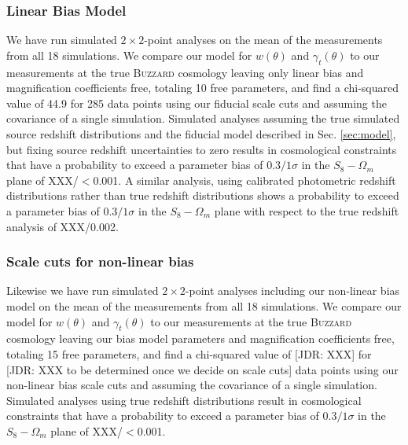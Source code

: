 \documentclass[fleqn,usenatbib]{mnras}
\newcommand{\lcdm}{$\Lambda$CDM}
\newcommand{\jdr}[1]{{\color{blue}[JDR: #1]}}
\begin{document}
\subsubsection{Linear Bias Model}
We have run simulated $2\times 2$-point analyses on the mean of the measurements from all 18 simulations. We compare our model for $w(\theta)$ and $\gamma_t(\theta)$ to our measurements at the true \textsc{Buzzard} cosmology leaving only linear bias and magnification coefficients free, totaling 10 free parameters, and find a chi-squared value of 44.9 for 285 data points using our fiducial scale cuts and assuming the covariance of a single simulation. Simulated analyses assuming the true simulated source redshift distributions and the fiducial model described in Sec. \ref{sec:model}, but fixing source redshift uncertainties to zero results in cosmological constraints that have a probability to exceed a parameter bias of $0.3/1\sigma$ in the $S_8-\Omega_{m}$ plane of XXX/$<$0.001. A similar analysis, using calibrated photometric redshift distributions rather than true redshift distributions shows a probability to exceed a parameter bias of $0.3/1\sigma$ in the $S_8-\Omega_{m}$ plane with respect to the true redshift analysis of XXX/0.002.

\subsubsection{Scale cuts for non-linear bias}
Likewise we have run simulated $2\times 2$-point analyses including our non-linear bias model on the mean of the measurements from all 18 simulations. We compare our model for $w(\theta)$ and $\gamma_t(\theta)$ to our measurements at the true \textsc{Buzzard} cosmology leaving our bias model parameters and magnification coefficients free, totaling 15 free parameters, and find a chi-squared value of \jdr{XXX} for \jdr{XXX to be determined once we decide on scale cuts} data points using our non-linear bias scale cuts and assuming the covariance of a single simulation. Simulated analyses using true redshift distributions result in cosmological constraints that have a probability to exceed a parameter bias of $0.3/1\sigma$ in the $S_8-\Omega_{m}$ plane of XXX/$<$0.001. 


\end{document}
